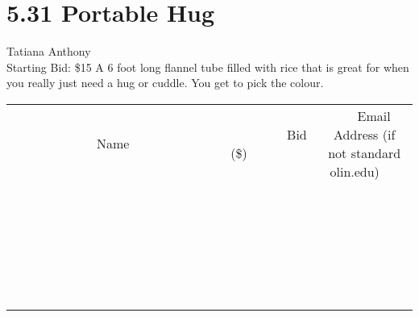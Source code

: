 \documentclass[11pt]{article}
\begin{document}
\section*{5.31 Portable Hug}
Tatiana Anthony
\\
Starting Bid: \$15
\newline
A 6 foot long flannel tube filled with rice that is great for when you really just need a hug or cuddle. You get to pick the colour.
\\[6ex]
\begin{tabular}{c c c}
~~~~~~~~~~~~~Name~~~~~~~~~~~~~ & ~~~~~~~~~Bid (\$)~~~~~~~~~  & ~~~Email Address (if not standard olin.edu)~~~\\
 & & \\
\hline
 & & \\
\hline
 & & \\
\hline
 & & \\
\hline
 & & \\
\hline
 & & \\
\hline
 & & \\
\hline
 & & \\
\hline
 & & \\
\hline
 & & \\
\hline
 & & \\
\hline
 & & \\
\hline
 & & \\
\hline
 & & \\
\hline
 & & \\
\hline
 & & \\
\hline
 & & \\
\hline
 & & \\
\hline
 & & \\
\hline
 & & \\
\hline
 & & \\
\hline
 & & \\
\hline
 & & \\
\hline
 & & \\
\hline
 & & \\
\hline
 & & \\
\hline
\end{tabular}
\newpage
\end{document}
